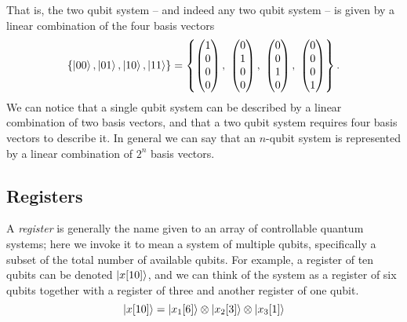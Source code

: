 That is, the two qubit system -- and indeed any two qubit system -- is given by a linear combination of the four basis vectors
\begin{equation}
    \left\{ \ket{00}, \ket{01}, \ket{10}, \ket{11} \right\} 
    = \left\{ \icol{1\\0\\0\\0}, \ \icol{0\\1\\0\\0}, \ \icol{0\\0\\1\\0}, \  \icol{0\\0\\0\\1} \right\}.
\end{equation}
We can notice that a single qubit system can be described by a linear combination of two basis vectors, 
    and that a two qubit system requires four basis vectors to describe it. 
In general we can say that an $n$-qubit system is represented by a linear combination of $2^n$ basis vectors. 

\subsection{Registers}
A \textit{register} is generally the name given to an array of controllable quantum systems; here we invoke it to mean a system of multiple qubits, specifically a subset of the total number of available qubits. 
For example, a register of ten qubits can be denoted $\ket{x[10]}$, and we can think of the system as a register of six qubits together with a register of three and another register of one qubit. 
$$ \ket{x[10]} = \ket{x_1[6]} \otimes \ket{x_2[3]} \otimes \ket{x_3[1]} $$


